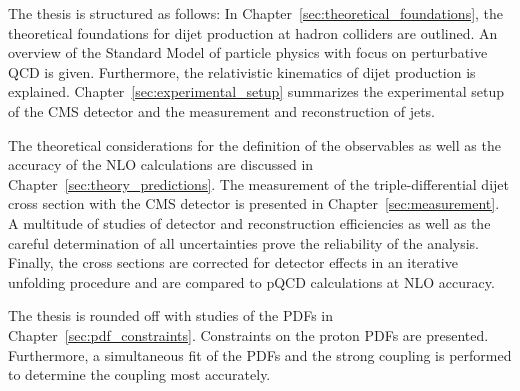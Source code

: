 The thesis is structured as follows: In
Chapter~\ref{sec:theoretical_foundations}, the theoretical foundations for dijet
production at hadron colliders are outlined. An overview of the Standard Model
of particle physics with focus on perturbative QCD is given.  Furthermore, the
relativistic kinematics of dijet production is explained.
Chapter~\ref{sec:experimental_setup} summarizes the experimental setup of the
CMS detector and the measurement and reconstruction of jets. 

The theoretical considerations for the definition of the observables as well as
the accuracy of the NLO calculations are discussed in
Chapter~\ref{sec:theory_predictions}. The measurement of the triple-differential
dijet cross section with the CMS detector is presented in
Chapter~\ref{sec:measurement}. A multitude of studies of detector and
reconstruction efficiencies as well as the careful determination of all
uncertainties prove the reliability of the analysis.  Finally, the cross
sections are corrected for detector effects in an iterative unfolding procedure
and are compared to pQCD calculations at NLO accuracy.

The thesis is rounded off with studies of the PDFs in
Chapter~\ref{sec:pdf_constraints}. Constraints on the proton PDFs are presented.
Furthermore, a simultaneous fit of the PDFs and the strong coupling is performed
to determine the coupling most accurately.

